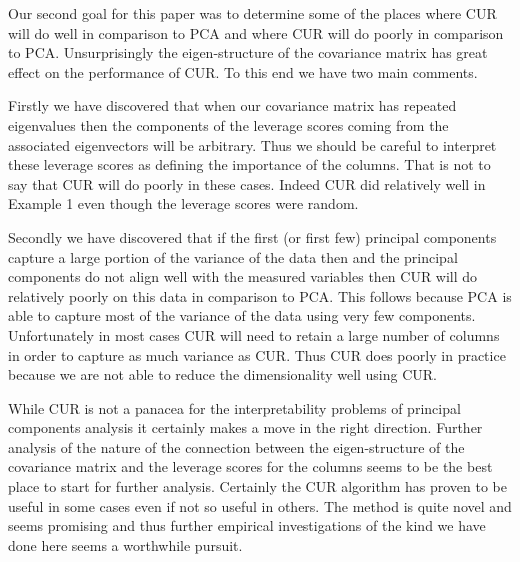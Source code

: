 \documentclass{book}
\begin{document}
\vspace{.5cm}

Our second goal for this paper was to determine some of the places where CUR will do well in comparison to PCA and where CUR will do poorly in comparison to PCA. Unsurprisingly the eigen-structure of the covariance matrix has great effect on the performance of CUR. To this end we have two main comments. 

Firstly we have discovered that when our covariance matrix has repeated eigenvalues then the components of the leverage scores coming from the associated eigenvectors will be arbitrary. Thus we should be careful to interpret these leverage scores as defining the importance of the columns. That is not to say that CUR will do poorly in these cases. Indeed CUR did relatively well in Example 1 even though the leverage scores were random. 

Secondly we have discovered that if the first (or first few) principal components capture a large portion of the variance of the data then and the principal components do not align well with the measured variables then CUR will do relatively poorly on this data in comparison to PCA. This follows because PCA is able to capture most of the variance of the data using very few components. Unfortunately in most cases CUR will need to retain a large number of columns in order to capture as much variance as CUR. Thus CUR does poorly in practice because we are not able to reduce the dimensionality well using CUR.

\vspace{.5cm}

While CUR is not a panacea for the interpretability problems of principal components analysis it certainly makes a move in the right direction. Further analysis of the nature of the connection between the eigen-structure of the covariance matrix and the leverage scores for the columns seems to be the best place to start for further analysis. Certainly the CUR algorithm has proven to be useful in some cases even if not so useful in others. The method is quite novel and seems promising and thus further empirical investigations of the kind we have done here seems a worthwhile pursuit. 

\end{document}
